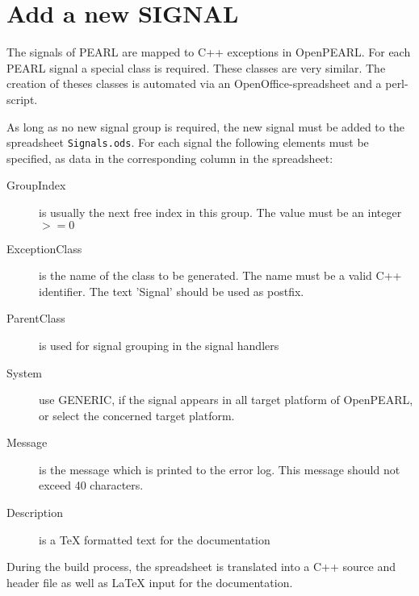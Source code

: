 \section{Add a new SIGNAL}
The signals of PEARL are mapped to C++ exceptions in OpenPEARL.
For each PEARL signal a special class is required.
These classes are very similar. The creation of theses classes
is automated via an OpenOffice-spreadsheet and a perl-script.

As long as no new signal group is required, the new signal
must be added to the spreadsheet \texttt{Signals.ods}.
For each signal the following elements must be specified, as 
data in the corresponding column in the spreadsheet:
\begin{description} 
\item[GroupIndex] is usually the next free index in this group.
   The value must be an integer $>= 0$
\item [ExceptionClass] is the name of the class to be generated.
   The name must be a valid C++ identifier. The text 'Signal' should
   be used as postfix.
\item[ParentClass] is used for signal grouping in the signal handlers
\item[System] use GENERIC, if the signal appears in all target
   platform of OpenPEARL, or select the concerned target platform.
\item[Message] is the message which is printed to the error log.
   This message should not exceed 40 characters.
\item[Description] is a TeX formatted text for the documentation
\end{description}

During the build process, the spreadsheet is translated into a C++ source
and  header file as well as LaTeX input for the documentation.
